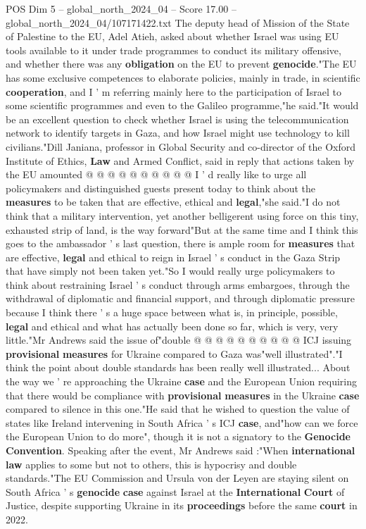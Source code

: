 \begin{textsample}{POS Dim 5 – global\_north\_2024\_04 – Score 17.00 – global\_north\_2024\_04/107171422.txt}
The deputy head of Mission of the State of Palestine to the EU, Adel Atieh, asked about whether Israel was using EU tools available to it under trade programmes to conduct its military offensive, and whether there was any \textbf{obligation} on the EU to prevent \textbf{genocide}."The EU has some exclusive competences to elaborate policies, mainly in trade, in scientific \textbf{cooperation}, and I ' m referring mainly here to the participation of Israel to some scientific programmes and even to the Galileo programme,"he said."It would be an excellent question to check whether Israel is using the telecommunication network to identify targets in Gaza, and how Israel might use technology to kill civilians."Dill Janiana, professor in Global Security and co-director of the Oxford Institute of Ethics, \textbf{Law} and Armed Conflict, said in reply that actions taken by the EU amounted @ @ @ @ @ @ @ @ @ @ I ' d really like to urge all policymakers and distinguished guests present today to think about the \textbf{measures} to be taken that are effective, ethical and \textbf{legal},"she said."I do not think that a military intervention, yet another belligerent using force on this tiny, exhausted strip of land, is the way forward"But at the same time and I think this goes to the ambassador ' s last question, there is ample room for \textbf{measures} that are effective, \textbf{legal} and ethical to reign in Israel ' s conduct in the Gaza Strip that have simply not been taken yet."So I would really urge policymakers to think about restraining Israel ' s conduct through arms embargoes, through the withdrawal of diplomatic and financial support, and through diplomatic pressure because I think there ' s a huge space between what is, in principle, possible, \textbf{legal} and ethical and what has actually been done so far, which is very, very little."Mr Andrews said the issue of"double @ @ @ @ @ @ @ @ @ @ ICJ issuing \textbf{provisional} \textbf{measures} for Ukraine compared to Gaza was"well illustrated"."I think the point about double standards has been really well illustrated...
About the way we ' re approaching the Ukraine \textbf{case} and the European Union requiring that there would be compliance with \textbf{provisional} \textbf{measures} in the Ukraine \textbf{case} compared to silence in this one."He said that he wished to question the value of states like Ireland intervening in South Africa ' s ICJ \textbf{case}, and"how can we force the European Union to do more", though it is not a signatory to the \textbf{Genocide} \textbf{Convention}.
Speaking after the event, Mr Andrews said :"When \textbf{international} \textbf{law} applies to some but not to others, this is hypocrisy and double standards."The EU Commission and Ursula von der Leyen are staying silent on South Africa ' s \textbf{genocide} \textbf{case} against Israel at the \textbf{International} \textbf{Court} of Justice, despite supporting Ukraine in its \textbf{proceedings} before the same \textbf{court} in 2022.

\end{textsample}
